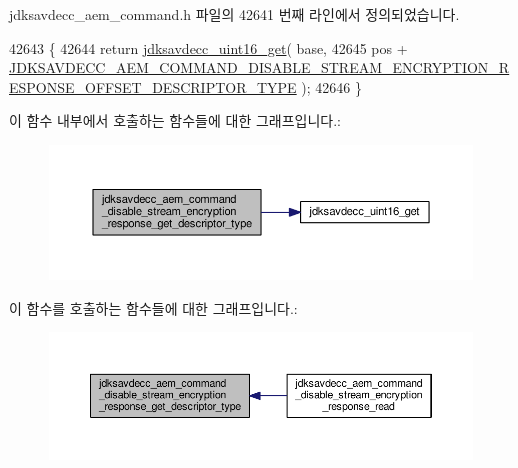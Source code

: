 jdksavdecc\+\_\+aem\+\_\+command.\+h 파일의 42641 번째 라인에서 정의되었습니다.


\begin{DoxyCode}
42643 \{
42644     \textcolor{keywordflow}{return} \hyperlink{group__endian_ga3fbbbc20be954aa61e039872965b0dc9}{jdksavdecc\_uint16\_get}( base,
42645                                   pos + 
      \hyperlink{group__command__disable__stream__encryption__response_ga27c81c1fb1cb51ecb1d0b5dd451d2ffd}{JDKSAVDECC\_AEM\_COMMAND\_DISABLE\_STREAM\_ENCRYPTION\_RESPONSE\_OFFSET\_DESCRIPTOR\_TYPE}
       );
42646 \}
\end{DoxyCode}


이 함수 내부에서 호출하는 함수들에 대한 그래프입니다.\+:
\nopagebreak
\begin{figure}[H]
\begin{center}
\leavevmode
\includegraphics[width=350pt]{group__command__disable__stream__encryption__response_ga05227a24d6e4b6b5448fffebf489a500_cgraph}
\end{center}
\end{figure}




이 함수를 호출하는 함수들에 대한 그래프입니다.\+:
\nopagebreak
\begin{figure}[H]
\begin{center}
\leavevmode
\includegraphics[width=350pt]{group__command__disable__stream__encryption__response_ga05227a24d6e4b6b5448fffebf489a500_icgraph}
\end{center}
\end{figure}


